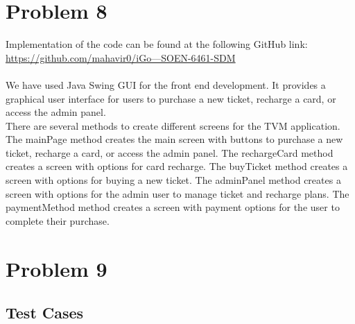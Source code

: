 \documentclass[a4paper, 11pt]{report}
\begin{document}
\chapter{Problem 8}
Implementation of the code can be found at the following GitHub link:\\
\href{https://github.com/mahavir0/iGo---SOEN-6461-SDM}{https://github.com/mahavir0/iGo---SOEN-6461-SDM}
\\\\
We have used Java Swing GUI for the front end development. It provides a graphical user interface for users to purchase a new ticket, recharge a card, or access the admin panel.\\
There are several methods to create different screens for the TVM application. The mainPage method creates the main screen with buttons to purchase a new ticket, recharge a card, or access the admin panel. The rechargeCard method creates a screen with options for card recharge. The buyTicket method creates a screen with options for buying a new ticket. The adminPanel method creates a screen with options for the admin user to manage ticket and recharge plans. The paymentMethod method creates a screen with payment options for the user to complete their purchase.

\chapter{Problem 9}
\renewcommand{\thesection}{9.\arabic{section}} %
\setcounter{section}{0} %
\section{Test Cases}
\end{document}
